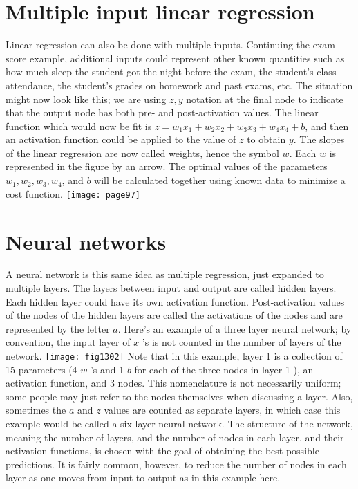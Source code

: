 \section*{Multiple input linear regression}
Linear regression can also be done with multiple inputs. Continuing the exam score example, additional inputs could represent other known quantities such as how much sleep the student got the night before the exam, the student's class attendance, the student's grades on homework and past exams, etc. The situation might now look like this; we are using $z, y$ notation at the final node to indicate that the output node has both pre- and post-activation values.
The linear function which would now be fit is $z=w_{1} x_{1}+w_{2} x_{2}+w_{3} x_{3}+w_{4} x_{4}+b$, and then an activation function could be applied to the value of $z$ to obtain $y$. The slopes of the linear regression are now called weights, hence the symbol $w$. Each $w$ is represented in the figure by an arrow. The optimal values of the parameters $w_{1}, w_{2}, w_{3}, w_{4}$, and $b$ will be calculated together using known data to minimize a cost function.
\texttt{[image: page97]}
\section*{Neural networks}
A neural network is this same idea as multiple regression, just expanded to multiple layers. The layers between input and output are called hidden layers. Each hidden layer could have its own activation function. Post-activation values of the nodes of the hidden layers are called the activations of the nodes and are represented by the letter $a$. Here's an example of a three layer neural network; by convention, the input layer of $x$ 's is not counted in the number of layers of the network.
\texttt{[image: fig1302]}
Note that in this example, layer 1 is a collection of 15 parameters (4 $w$ \rq s and 1 $b$ for each of the three nodes in layer 1 ), an activation function, and 3 nodes. This nomenclature is not necessarily uniform; some people may just refer to the nodes themselves when discussing a layer. Also, sometimes the $a$ and $z$ values are counted as separate layers, in which case this example would be called a six-layer neural network. The structure of the network, meaning the number of layers, and the number of nodes in each layer, and their activation functions, is chosen with the goal of obtaining the best possible predictions. It is fairly common, however, to reduce the number of nodes in each layer as one moves from input to output as in this example here.

